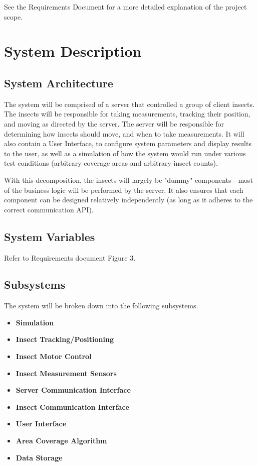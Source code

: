 \documentclass[11pt]{article}
\begin{document}
See the Requirements Document for a more detailed explanation of the project scope.

\section{System Description}

\subsection{System Architecture}
The system will be comprised of a server that controlled a group of client insects.
The insects will be responsible for taking measurements, tracking their position,
and moving as directed by the server.
The server will be responsible for determining how insects should move, and when to take
measurements. It will also contain a User Interface, to configure system parameters and
display results to the user, as well as a simulation of how the system would run under
various test conditions (arbitrary coverage areas and arbitrary insect counts).

With this decomposition, the insects will largely be "dummy" components - most of the
business logic will be performed by the server. It also ensures that each component
can be designed relatively independently (as long as it adheres to the correct communication
API).


\subsection{System Variables}
Refer to Requirements document Figure 3.
\subsection{Subsystems}
The system will be broken down into the following subsystems. 
\begin{itemize}
\item \textbf{Simulation}
\item \textbf{Insect Tracking/Positioning}
\item \textbf{Insect Motor Control}
\item \textbf{Insect Measurement Sensors}
\item \textbf{Server Communication Interface}
\item \textbf{Insect Communication Interface}
\item \textbf{User Interface}
\item \textbf{Area Coverage Algorithm}
\item \textbf{Data Storage}

\end{itemize}
\end{document}
